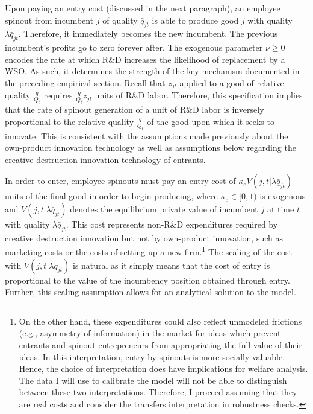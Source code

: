 \documentclass[ecta,nameyear,final]{econsocart}
\theoremstyle{plain}
\theoremstyle{remark}
\begin{document}
Upon paying an entry cost (discussed in the next paragraph), an employee spinout from incumbent $j$ of quality $\bar{q}_{jt}$ is able to produce good $j$ with quality $\lambda \bar{q}_{jt}$. Therefore, it immediately becomes the new incumbent. The previous incumbent's profits go to zero forever after. The exogenous parameter $\nu \ge 0$ encodes the rate at which R\&D increases the likelihood of replacement by a WSO. As such, it determines the strength of the key mechanism documented in the preceding empirical section. Recall that $z_{jt}$ applied to a good of relative quality $\frac{q}{Q_t}$ requires $\frac{q}{Q_t}z_{jt}$ units of R\&D labor. Therefore, this specification implies that the rate of spinout generation of a unit of R\&D labor is inversely proportional to the relative quality $\frac{q}{Q_t}$ of the good upon which it seeks to innovate. This is consistent with the assumptions made previously about the own-product innovation technology as well as assumptions below regarding the creative destruction innovation technology of entrants.

In order to enter, employee spinouts must pay an entry cost of $\kappa_{e} V(j,t|\lambda \bar{q}_{jt})$ units of the final good in order to begin producing, where $\kappa_e \in [0,1)$ is exogenous and $V(j,t|\lambda \bar{q}_{jt})$ denotes the equilibrium private value of incumbent $j$ at time $t$ with quality $\lambda \bar{q}_{jt}$. This cost represents non-R\&D expenditures required by creative destruction innovation but not by own-product innovation, such as marketing costs or the costs of setting up a new firm.\footnote{On the other hand, these expenditures could also reflect unmodeled frictions (e.g., asymmetry of information) in the market for ideas which prevent entrants and spinout entrepreneurs from appropriating the full value of their ideas. In this interpretation, entry by spinouts is more socially valuable. Hence, the choice of interpretation does have implications for welfare analysis. The data I will use to calibrate the model will not be able to distinguish between these two interpretations. Therefore, I proceed assuming that they are real costs and consider the transfers interpretation in robustness checks.} The scaling of the cost with $V(j,t|\lambda q_{jt})$ is natural as it simply means that the cost of entry is proportional to the value of the incumbency position obtained through entry. Further, this scaling assumption allows for an analytical solution to the model.
\end{document}
